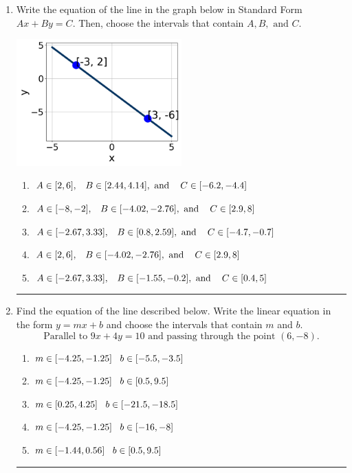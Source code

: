 \documentclass[14pt]{extbook}
\newcommand{\litem}[1]{\item#1\hspace*{-1cm}\rule{\textwidth}{0.4pt}}
\begin{document}
\begin{enumerate}
{\begin{enumerate}[label=\Alph*.]
\end{enumerate} }
\litem{
Write the equation of the line in the graph below in Standard Form $Ax+By=C$. Then, choose the intervals that contain $A, B, \text{ and } C$.
\begin{center}
    \includegraphics[width=0.5\textwidth]{../Figures/linearGraphToStandardCopyA.png}
\end{center}
\begin{enumerate}[label=\Alph*.]
\item \( A \in [2, 6], \hspace{3mm} B \in [2.44, 4.14], \text{ and } \hspace{3mm} C \in [-6.2, -4.4] \)
\item \( A \in [-8, -2], \hspace{3mm} B \in [-4.02, -2.76], \text{ and } \hspace{3mm} C \in [2.9, 8] \)
\item \( A \in [-2.67, 3.33], \hspace{3mm} B \in [0.8, 2.59], \text{ and } \hspace{3mm} C \in [-4.7, -0.7] \)
\item \( A \in [2, 6], \hspace{3mm} B \in [-4.02, -2.76], \text{ and } \hspace{3mm} C \in [2.9, 8] \)
\item \( A \in [-2.67, 3.33], \hspace{3mm} B \in [-1.55, -0.2], \text{ and } \hspace{3mm} C \in [0.4, 5] \)

\end{enumerate} }
\litem{
Find the equation of the line described below. Write the linear equation in the form $ y=mx+b $ and choose the intervals that contain $m$ and $b$.\[ \text{Parallel to } 9 x + 4 y = 10 \text{ and passing through the point } (6, -8). \]\begin{enumerate}[label=\Alph*.]
\item \( m \in [-4.25, -1.25] \hspace*{3mm} b \in [-5.5, -3.5] \)
\item \( m \in [-4.25, -1.25] \hspace*{3mm} b \in [0.5, 9.5] \)
\item \( m \in [0.25, 4.25] \hspace*{3mm} b \in [-21.5, -18.5] \)
\item \( m \in [-4.25, -1.25] \hspace*{3mm} b \in [-16, -8] \)
\item \( m \in [-1.44, 0.56] \hspace*{3mm} b \in [0.5, 9.5] \)


\end{enumerate}}
\end{enumerate}
\end{document}
